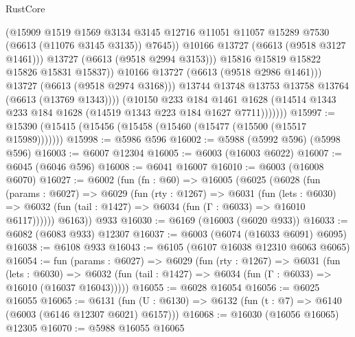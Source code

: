 \begin{lexlean}{RustCore}
\begin{coremodule}
                              (@15909
                                @1519
                                @1569
                                @3134
                                @3145
                                @12716
                                @11051
                                @11057
                                @15289
                                @7530
                                (@6613 (@11076 @3145 @3135))
                                @7645))
                            @10166
                            @13727
                            (@6613 (@9518 @3127 @1461)))
                          @13727
                          (@6613 (@9518 @2994 @3153)))
                        @15816
                        @15819
                        @15822
                        @15826
                        @15831
                        @15837))
                    @10166
                    @13727
                    (@6613 (@9518 @2986 @1461)))
                  @13727
                  (@6613 (@9518 @2974 @3168)))
                @13744
                @13748
                @13753
                @13758
                @13764
                (@6613 (@13769 @1343))))
            (@10150
              @233
              @184
              @1461
              @1628
              (@14514 @1343 @233 @184 @1628 (@14519 @1343 @223 @184 @1627 @7711)))))))
@15997 := @15390 (@15415 (@15456 (@15458 (@15460 (@15477 (@15500 (@15517 @15989)))))))
@15998 := @5986 @596
@16002 := @5988 (@5992 @596) (@5998 @596)
@16003 := @6007 @12304
@16005 := @6003 (@16003 @6022)
@16007 := @6045 (@6046 @596)
@16008 := @6041 @16007
@16010 := @6003 (@16008 @6070)
@16027 := @6002
    (fun (fn : @60) =>
    @16005
      (@6025
        (@6028
          (fun (params : @6027) =>
          @6029
            (fun (rty : @1267) =>
            @6031
              (fun (lets : @6030) =>
              @6032 (fun (tail : @1427) => @6034 (fun (Γ : @6033) => @16010 @6117))))))
        @6163))
    @933
@16030 := @6169 (@16003 (@6020 @933))
@16033 := @6082 (@6083 @933) @12307
@16037 := @6003 (@6074 (@16033 @6091) @6095)
@16038 := @6108 @933
@16043 := @6105 (@6107 @16038 @12310 @6063 @6065)
@16054 := fun (params : @6027) =>
  @6029
    (fun (rty : @1267) =>
    @6031
      (fun (lets : @6030) =>
      @6032 (fun (tail : @1427) => @6034 (fun (Γ : @6033) => @16010 (@16037 @16043)))))
@16055 := @6028 @16054
@16056 := @6025 @16055
@16065 := @6131
    (fun (U : @6130) => @6132 (fun (t : @7) => @6140 (@6003 (@6146 @12307 @6021) @6157)))
@16068 := @16030 (@16056 @16065) @12305
@16070 := @5988 @16055 @16065

\end{coremodule}
\end{lexlean}

